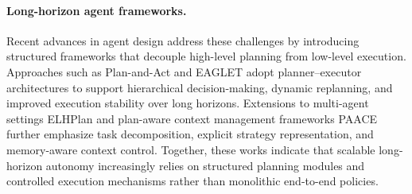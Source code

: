 \paragraph{Long-horizon agent frameworks.}
Recent advances in agent design address these challenges by introducing structured frameworks that decouple high-level planning from low-level execution. Approaches such as Plan-and-Act \citep{erdogan2025planandactimprovingplanningagents} and EAGLET \citep{si2025goalplanjustwish} adopt planner--executor architectures to support hierarchical decision-making, dynamic replanning, and improved execution stability over long horizons. Extensions to multi-agent settings ELHPlan \citep{ling2025elhplanefficientlonghorizontask} and plan-aware context management frameworks PAACE \citep{yuksel2025paaceplanawareautomatedagent} further emphasize task decomposition, explicit strategy representation, and memory-aware context control. Together, these works indicate that scalable long-horizon autonomy increasingly relies on structured planning modules and controlled execution mechanisms rather than monolithic end-to-end policies.
